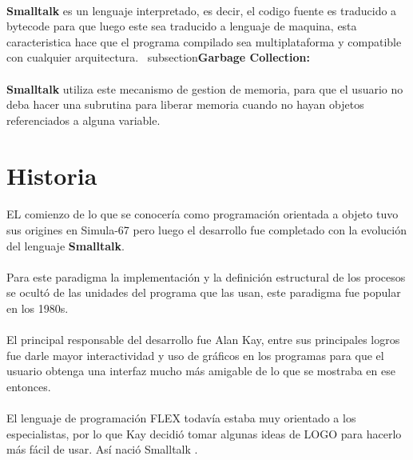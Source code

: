 \documentclass[11pt]{article}
\begin{document}
\paragraph{} \noindent
\textbf{Smalltalk} es un lenguaje interpretado, es decir, el codigo fuente es traducido a bytecode para que luego este sea traducido a lenguaje de maquina, esta caracteristica hace que el programa compilado sea multiplataforma y compatible con cualquier arquitectura.
\ subsection{\textbf{Garbage Collection:}}
\paragraph{} \noindent
\textbf{Smalltalk} utiliza este mecanismo de gestion de memoria, para que el usuario no deba hacer una subrutina para liberar memoria cuando no hayan objetos referenciados a alguna variable.
\section{\textbf{Historia}}
\paragraph{} \noindent
EL comienzo de lo que se conocería como programación orientada a objeto tuvo sus origines en Simula-67 pero luego el desarrollo fue completado con la evolución del lenguaje \textbf{Smalltalk}.
\paragraph{} \noindent
Para este paradigma la implementación y la definición estructural de los procesos se ocultó de las unidades del programa que las usan, este paradigma fue popular en los 1980s.
\paragraph{} \noindent
El principal responsable del desarrollo fue Alan Kay, entre sus principales logros fue darle mayor interactividad y uso de gráficos en los programas para que el usuario obtenga una interfaz mucho más amigable de lo que se mostraba en ese entonces.
\paragraph{} \noindent
El lenguaje de programación FLEX todavía estaba muy orientado a los especialistas, por lo que Kay decidió tomar algunas ideas de LOGO para hacerlo más fácil de usar. Así nació Smalltalk \cite{cinvestav}.
\end{document}

